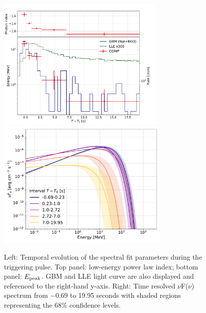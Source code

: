 \documentclass[preprint]{aastex631}
\begin{document}
\begin{figure}[t]
    \centering    
    \includegraphics[height=6.5cm]{precursor_C_bb_v4_big_n4_n7_MeV_v1.pdf}
    \includegraphics[height=6.3cm]{time_resolved_models_precursor_C_v4_big_n4_n7_contour_v1.pdf}
    \caption{Left: Temporal evolution of the spectral fit parameters during the triggering pulse. Top panel: low-energy power law index; bottom panel: $E_{\rm peak}$. GBM and LLE light curve are also displayed and referenced to the right-hand y-axis.  Right: Time resolved $\nu$F($\nu$) spectrum from $-0.69$ to 19.95 seconds with shaded regions representing the 68\% confidence levels. }
    \label{fig:precursor}
\end{figure}
\end{document}
